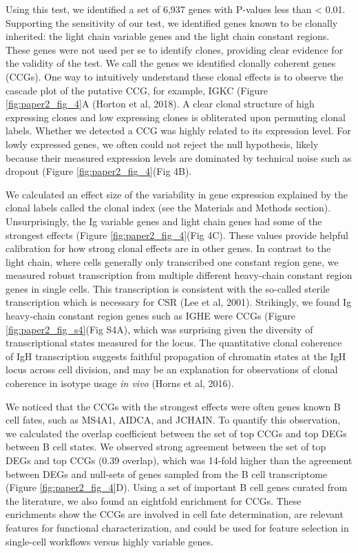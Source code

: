 Using this test, we identified a set of 6,937 genes with P-values less than < 0.01. Supporting the sensitivity of our test, we identified genes known to be clonally inherited: the light chain variable genes and the light chain constant regions. These genes were not used per se to identify clones, providing clear evidence for the validity of the test. We call the genes we identified clonally coherent genes (CCGs). One way to intuitively understand these clonal effects is to observe the cascade plot of the putative CCG, for example, IGKC  (Figure \ref{fig:paper2_fig_4}A (Horton et al, 2018). A clear clonal structure of high expressing clones and low expressing clones is obliterated upon permuting clonal labels. Whether we detected a CCG was highly related to its expression level. For lowly expressed genes, we often could not reject the null hypothesis, likely because their measured expression levels are dominated by technical noise such as dropout (Figure \ref{fig:paper2_fig_4}(Fig 4B).

We calculated an effect size of the variability in gene expression explained by the clonal labels called the clonal index (see the Materials and Methods section). Unsurprisingly, the Ig variable genes and light chain genes had some of the strongest effects (Figure \ref{fig:paper2_fig_4}(Fig 4C). These values provide helpful calibration for how strong clonal effects are in other genes. In contrast to the light chain, where cells generally only transcribed one constant region gene, we measured robust transcription from multiple different heavy-chain constant region genes in single cells. This transcription is consistent with the so-called sterile transcription which is necessary for CSR (Lee et al, 2001). Strikingly, we found Ig heavy-chain constant region genes such as IGHE were CCGs (Figure \ref{fig:paper2_fig_s4}(Fig S4A), which was surprising given the diversity of transcriptional states measured for the locus. The quantitative clonal coherence of IgH transcription suggests faithful propagation of chromatin states at the IgH locus across cell division, and may be an explanation for observations of clonal coherence in isotype usage \textit{in vivo} (Horns et al, 2016).

We noticed that the CCGs with the strongest effects were often genes known B cell fates, such as MS4A1, AIDCA, and JCHAIN. To quantify this observation, we calculated the overlap coefficient between the set of top CCGs and top DEGs between B cell states. We observed strong agreement between the set of top DEGs and top CCGs (0.39 overlap), which was 14-fold higher than the agreement between DEGs and null-sets of genes sampled from the B cell transcriptome (Figure \ref{fig:paper2_fig_4}D). Using a set of important B cell genes curated from the literature\cite{morgan_unraveling_2022}, we also found an eightfold enrichment for CCGs. These enrichments show the CCGs are involved in cell fate determination, are relevant features for functional characterization, and could be used for feature selection in single-cell workflows versus highly variable genes.

